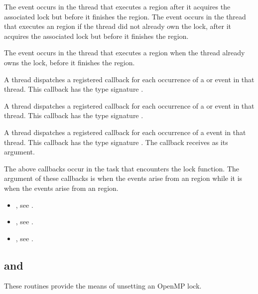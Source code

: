The  event occurs in the thread that executes a 
 region after it acquires the associated lock but 
before it finishes the region. The  event occurs 
in the thread that executes an  region if the 
thread did not already own the lock, after it acquires the associated 
lock but before it finishes the region.

The  event occurs in the thread that executes
a  region when the thread already owns the lock,
before it finishes the region.

\tools
A thread dispatches a registered 
callback for each occurrence of a  or  
event in that thread.  This callback has the type signature 
.

A thread dispatches a registered 
callback for each occurrence of a  or  
event in that thread.  This callback has the type signature 
.

A thread dispatches a registered 
callback for each occurrence of a  event
in that thread. This callback has the type signature .
The callback receives  as its  argument.

The above callbacks occur in the task that encounters the lock function.  
The argument of these callbacks is  when
the events arise from an  region while it is 
  when the events arise from an 
 region.

\crossreferences
\begin{itemize}
\item {}, see
.

\item {}, see
.

\item {}, see
.
\end{itemize}



\subsection{ and }
\label{subsec:omp_unset_lock and omp_unset_nest_lock}
\summary
These routines provide the means of unsetting an OpenMP lock.

